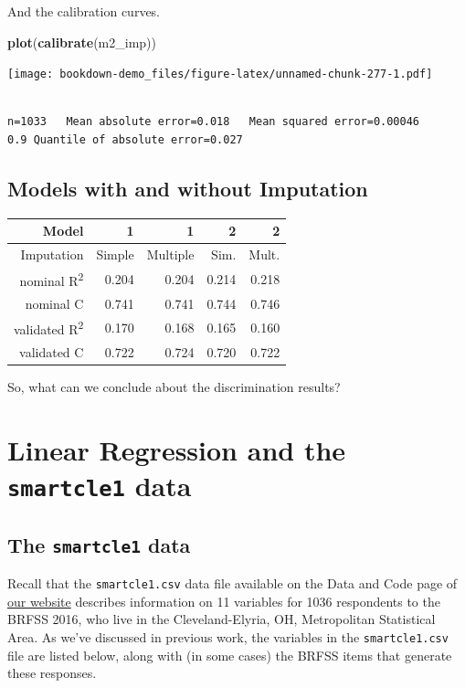\documentclass[]{book}
\newenvironment{Shaded}{\begin{snugshade}}{\end{snugshade}}
\newcommand{\KeywordTok}[1]{\textcolor[rgb]{0.13,0.29,0.53}{\textbf{#1}}}
\newcommand{\NormalTok}[1]{#1}
\theoremstyle{definition}
\theoremstyle{definition}
\theoremstyle{definition}
\theoremstyle{remark}
\begin{document}
And the calibration curves.

\begin{Shaded}
\begin{Highlighting}[]
\KeywordTok{plot}\NormalTok{(}\KeywordTok{calibrate}\NormalTok{(m2_imp))}
\end{Highlighting}
\end{Shaded}

\texttt{[image: bookdown-demo\_files/figure-latex/unnamed-chunk-277-1.pdf]}

\begin{verbatim}

n=1033   Mean absolute error=0.018   Mean squared error=0.00046
0.9 Quantile of absolute error=0.027
\end{verbatim}

\section{Models with and without
Imputation}\label{models-with-and-without-imputation}

\begin{longtable}[]{@{}rrrrr@{}}
\toprule
Model & 1 & 1 & 2 & 2\tabularnewline
\midrule
\endhead
Imputation & Simple & Multiple & Sim. & Mult.\tabularnewline
nominal R\textsuperscript{2} & 0.204 & 0.204 & 0.214 &
0.218\tabularnewline
nominal C & 0.741 & 0.741 & 0.744 & 0.746\tabularnewline
validated R\textsuperscript{2} & 0.170 & 0.168 & 0.165 &
0.160\tabularnewline
validated C & 0.722 & 0.724 & 0.720 & 0.722\tabularnewline
\bottomrule
\end{longtable}

So, what can we conclude about the discrimination results?

\chapter{\texorpdfstring{Linear Regression and the \texttt{smartcle1}
data}{Linear Regression and the smartcle1 data}}\label{linear-regression-and-the-smartcle1-data}

\section{\texorpdfstring{The \texttt{smartcle1}
data}{The smartcle1 data}}\label{the-smartcle1-data-1}

Recall that the \texttt{smartcle1.csv} data file available on the Data
and Code page of \href{https://github.com/THOMASELOVE/432-2018}{our
website} describes information on 11 variables for 1036 respondents to
the BRFSS 2016, who live in the Cleveland-Elyria, OH, Metropolitan
Statistical Area. As we've discussed in previous work, the variables in
the \texttt{smartcle1.csv} file are listed below, along with (in some
cases) the BRFSS items that generate these responses.
\end{document}
